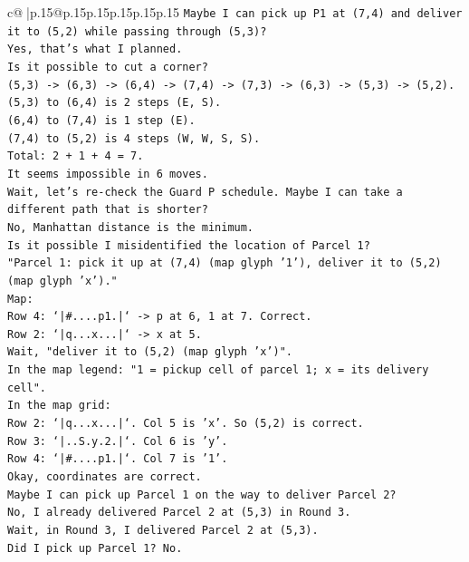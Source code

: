 \documentclass{article}
\begin{document}
{\begin{supertabular}{c@{$\;$}|p{.15\linewidth}@{}p{.15\linewidth}p{.15\linewidth}p{.15\linewidth}p{.15\linewidth}p{.15\linewidth}}
{{{\texttt{Maybe I can pick up P1 at (7,4) and deliver it to (5,2) while passing through (5,3)?} \\
\texttt{Yes, that's what I planned.} \\
\texttt{Is it possible to cut a corner?} \\
\texttt{(5,3) {-}> (6,3) {-}> (6,4) {-}> (7,4) {-}> (7,3) {-}> (6,3) {-}> (5,3) {-}> (5,2).} \\
\texttt{(5,3) to (6,4) is 2 steps (E, S).} \\
\texttt{(6,4) to (7,4) is 1 step (E).} \\
\texttt{(7,4) to (5,2) is 4 steps (W, W, S, S).} \\
\texttt{Total: 2 + 1 + 4 = 7.} \\
\texttt{It seems impossible in 6 moves.} \\
\texttt{Wait, let's re{-}check the Guard P schedule. Maybe I can take a different path that is shorter?} \\
\texttt{No, Manhattan distance is the minimum.} \\
\texttt{Is it possible I misidentified the location of Parcel 1?} \\
\texttt{"Parcel 1: pick it up at (7,4) (map glyph '1'), deliver it to (5,2) (map glyph 'x')."} \\
\texttt{Map:} \\
\texttt{Row 4: `|\#....p1.|` {-}> p at 6, 1 at 7. Correct.} \\
\texttt{Row 2: `|q...x...|` {-}> x at 5.} \\
\texttt{Wait, "deliver it to (5,2) (map glyph 'x')".} \\
\texttt{In the map legend: "1 = pickup cell of parcel 1; x = its delivery cell".} \\
\texttt{In the map grid:} \\
\texttt{Row 2: `|q...x...|`. Col 5 is 'x'. So (5,2) is correct.} \\
\texttt{Row 3: `|..S.y.2.|`. Col 6 is 'y'.} \\
\texttt{Row 4: `|\#....p1.|`. Col 7 is '1'.} \\
\texttt{Okay, coordinates are correct.} \\
\texttt{Maybe I can pick up Parcel 1 on the way to deliver Parcel 2?} \\
\texttt{No, I already delivered Parcel 2 at (5,3) in Round 3.} \\
\texttt{Wait, in Round 3, I delivered Parcel 2 at (5,3).} \\
\texttt{Did I pick up Parcel 1? No.} \\
}}}
\end{supertabular}}
\end{document}

